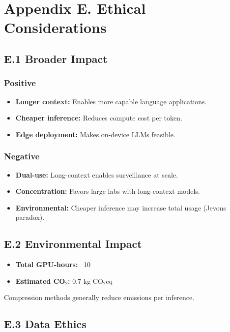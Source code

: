 
\section{Appendix E. Ethical Considerations}

\subsection{E.1 Broader Impact}

\subsubsection{Positive}
\begin{itemize}
\item \textbf{Longer context:} Enables more capable language applications.
\item \textbf{Cheaper inference:} Reduces compute cost per token.
\item \textbf{Edge deployment:} Makes on-device LLMs feasible.

\end{itemize}
\subsubsection{Negative}
\begin{itemize}
\item \textbf{Dual-use:} Long-context enables surveillance at scale.
\item \textbf{Concentration:} Favors large labs with long-context models.
\item \textbf{Environmental:} Cheaper inference may increase total usage (Jevons paradox).

\end{itemize}
\subsection{E.2 Environmental Impact}

\begin{itemize}
\item \textbf{Total GPU-hours:} ~10
\item \textbf{Estimated CO$_2$:} 0.7 kg CO$_2$eq

\end{itemize}
Compression methods generally reduce emissions per inference.

\subsection{E.3 Data Ethics}

